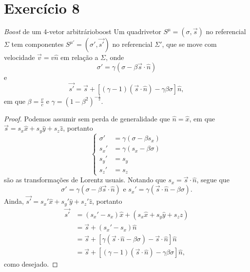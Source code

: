 \documentclass[12pt,a4paper]{article}
\numberwithin{equation}{section}
\begin{document}
\section*{Exercício 8}

\begin{proposition}{\textit{Boost} de um 4-vetor arbitrário}{boost}
    Um quadrivetor \(S^\mu = (\sigma, \vec{s})\) no referencial \(\Sigma\) tem componentes \(S^{\mu'} = (\sigma', \vec{s'})\) no referencial \(\Sigma'\), que se move com velocidade \(\vec{v} = v\hat{n}\) em relação a \(\Sigma\), onde
    \begin{equation*}
        \sigma' = \gamma (\sigma - \beta \vec{s} \cdot \hat{n})
    \end{equation*}
    e
    \begin{equation*}
        \vec{s'} = \vec{s} + \left[(\gamma - 1)(\vec{s} \cdot \hat{n}) - \gamma \beta \sigma\right]\hat{n},
    \end{equation*}
    em que \(\beta = \frac{v}{c}\) e \(\gamma = (1 - \beta^2)^{-\frac12}\).
\end{proposition}
\begin{proof}
    Podemos assumir sem perda de generalidade que \(\hat{n} = \hat{x}\), em que \(\vec{s} = s_x \hat{x} + s_y \hat{y} + s_z \hat{z}\), portanto
    \begin{equation*}
        \left\{
        \begin{aligned}
            \sigma' &= \gamma (\sigma - \beta s_x)\\
            s_x' &= \gamma (s_x - \beta \sigma)\\
            s_y' &= s_y\\
            s_z' &= s_z
        \end{aligned}
        \right.
    \end{equation*}
    são as transformações de Lorentz usuais. Notando que \(s_x = \vec{s}\cdot\hat{n}\), segue que
    \begin{equation*}
        \sigma' = \gamma (\sigma - \beta \vec{s} \cdot\hat{n})\text{ e }s_x' = \gamma (\vec{s} \cdot \hat{n} - \beta \sigma).
    \end{equation*}
    Ainda, \(\vec{s'} = s_x' \hat{x} + s_y' \hat{y} + s_z'\hat{z}\), portanto
    \begin{align*}
        \vec{s'} &= \left(s_x' - s_x\right) \hat{x} + \left(s_x \hat{x} + s_y \hat{y} + s_z \hat{z}\right)\\
                 &= \vec{s} + \left(s_x' - s_x\right) \hat{n}\\
                 &= \vec{s} + \left[\gamma (\vec{s} \cdot \hat{n} - \beta \sigma) - \vec{s}\cdot\hat{n}\right]\hat{n}\\
                 &= \vec{s} + \left[(\gamma - 1)(\vec{s}\cdot\hat{n}) - \gamma \beta \sigma\right]\hat{n},
    \end{align*}
    como desejado.
\end{proof}
\end{document}
